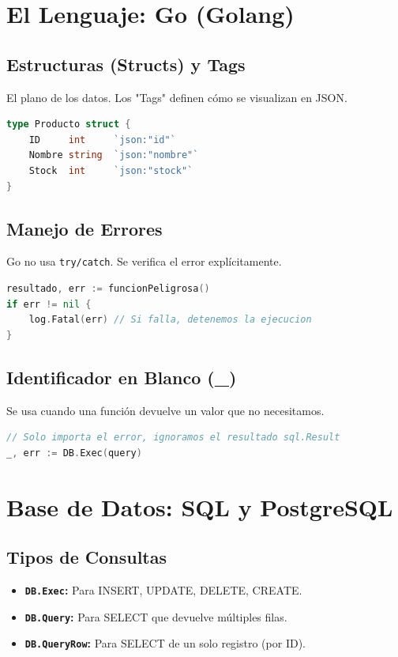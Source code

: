 \documentclass[a4paper,12pt]{article}
\begin{document}
\section{El Lenguaje: Go (Golang)}

\subsection{Estructuras (Structs) y Tags}
El plano de los datos. Los "Tags" definen cómo se visualizan en JSON.

\begin{lstlisting}[language=Go]
type Producto struct {
    ID     int     `json:"id"`
    Nombre string  `json:"nombre"`
    Stock  int     `json:"stock"`
}
\end{lstlisting}

\subsection{Manejo de Errores}
Go no usa \texttt{try/catch}. Se verifica el error explícitamente.

\begin{lstlisting}[language=Go]
resultado, err := funcionPeligrosa()
if err != nil {
    log.Fatal(err) // Si falla, detenemos la ejecucion
}
\end{lstlisting}

\subsection{Identificador en Blanco (\_)}
Se usa cuando una función devuelve un valor que no necesitamos.
\begin{lstlisting}[language=Go]
// Solo importa el error, ignoramos el resultado sql.Result
_, err := DB.Exec(query) 
\end{lstlisting}

\section{Base de Datos: SQL y PostgreSQL}

\subsection{Tipos de Consultas}
\begin{itemize}
    \item \textbf{\texttt{DB.Exec}:} Para INSERT, UPDATE, DELETE, CREATE.
    \item \textbf{\texttt{DB.Query}:} Para SELECT que devuelve múltiples filas.
    \item \textbf{\texttt{DB.QueryRow}:} Para SELECT de un solo registro (por ID).
\end{itemize}
\end{document}
